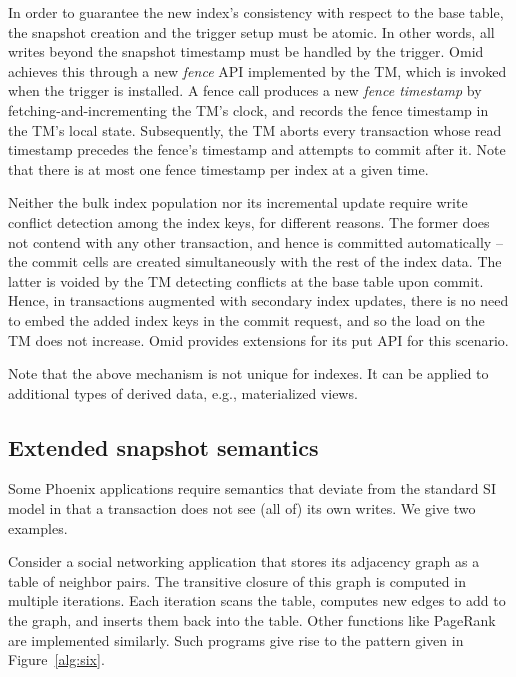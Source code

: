 In order to guarantee the new index's consistency with respect to the base table, the snapshot creation 
and the trigger setup must be atomic. In other words, all writes beyond the snapshot   
timestamp must be handled by the trigger. Omid achieves this through a new {\em fence\/} API
implemented by the TM, which is  invoked when the trigger is installed. 
A fence call produces a new \emph{fence timestamp} by fetching-and-incrementing the TM's clock, and 
records the fence timestamp in the TM's local state.  
Subsequently, the TM aborts every transaction whose read timestamp precedes the fence's 
timestamp and attempts to commit after it. 
Note that there is at most one fence timestamp per index at a given time.


Neither the bulk index population nor its incremental update require write conflict detection 
among the index keys, for different reasons. The former does not contend with any other 
transaction, and hence is committed automatically -- the commit cells are created simultaneously
with the rest of the index data. The latter is voided by the TM detecting conflicts at the base 
table upon commit. Hence, in transactions augmented with secondary index updates,  
there is no need to embed the added index keys in the commit 
request, and so the load on the TM does not increase. 
Omid provides extensions for its put API for this scenario. 

Note that the above mechanism is not unique for indexes. It can be applied to additional types of derived data, 
e.g., materialized views. 

\subsection{Extended snapshot semantics}
\label{ssec:snapshot}

Some Phoenix applications require semantics that  
deviate from the standard SI model in that a transaction does not see (all of) its own writes.
We give two examples. 

Consider a social networking application that stores its adjacency graph 
as a table of neighbor pairs. The transitive closure of this graph is computed in
multiple iterations. Each iteration scans the table, computes new edges to add to the 
graph, and inserts them back into the table. Other functions like PageRank are implemented
similarly. Such programs give rise to the pattern given in Figure~\ref{alg:six}. 

